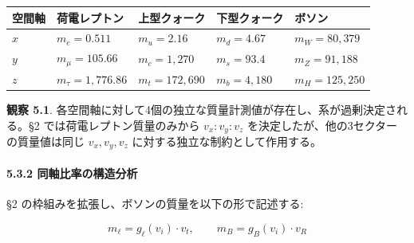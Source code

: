 \documentclass[
  a4paper,11pt]{ltjsarticle}
\newcounter{none} %
\begin{document}
{\def\LTcaptype{none} %
\begin{longtable}[]{@{}
  >{\centering\arraybackslash}p{}
  >{\centering\arraybackslash}p{}
  >{\centering\arraybackslash}p{}
  >{\centering\arraybackslash}p{}
  >{\centering\arraybackslash}p{}@{}}
\toprule\noalign{}
\begin{minipage}[b]{\linewidth}\centering
空間軸
\end{minipage} & \begin{minipage}[b]{\linewidth}\centering
荷電レプトン
\end{minipage} & \begin{minipage}[b]{\linewidth}\centering
上型クォーク
\end{minipage} & \begin{minipage}[b]{\linewidth}\centering
下型クォーク
\end{minipage} & \begin{minipage}[b]{\linewidth}\centering
ボソン
\end{minipage} \\
\midrule\noalign{}
\endhead
\bottomrule\noalign{}
\endlastfoot
\(x\) & \(m_e = 0.511\) & \(m_u = 2.16\) & \(m_d = 4.67\) &
\(m_W = 80{,}379\) \\
\(y\) & \(m_\mu = 105.66\) & \(m_c = 1{,}270\) & \(m_s = 93.4\) &
\(m_Z = 91{,}188\) \\
\(z\) & \(m_\tau = 1{,}776.86\) & \(m_t = 172{,}690\) &
\(m_b = 4{,}180\) & \(m_H = 125{,}250\) \\
\end{longtable}
}

\textbf{観察 5.1}.
各空間軸に対して4個の独立な質量計測値が存在し、系が過剰決定される。§2
では荷電レプトン質量のみから \(v_x : v_y : v_z\)
を決定したが、他の3セクターの質量値は同じ \(v_x, v_y, v_z\)
に対する独立な制約として作用する。

\paragraph{5.3.2
同軸比率の構造分析}\label{ux540cux8ef8ux6bd4ux7387ux306eux69cbux9020ux5206ux6790}

§2 の枠組みを拡張し、ボソンの質量を以下の形で記述する:

\[m_\ell = g_\ell(v_i) \cdot v_t, \qquad m_B = g_B(v_i) \cdot v_R\]
\end{document}
